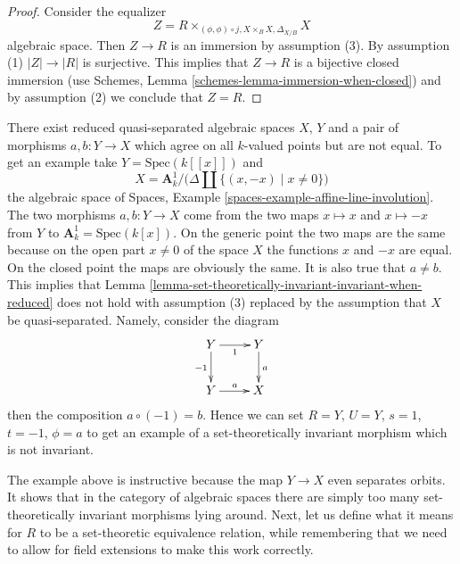 \begin{proof}
Consider the equalizer
$$
Z = R \times_{(\phi, \phi) \circ j, X \times_B X, \Delta_{X/B}} X
$$
algebraic space. Then $Z \to R$ is an immersion by assumption (3).
By assumption (1) $|Z| \to |R|$ is surjective. This implies that
$Z \to R$ is a bijective closed immersion (use
Schemes, Lemma \ref{schemes-lemma-immersion-when-closed})
and by assumption (2) we conclude that $Z = R$.
\end{proof}

\begin{example}
\label{example-not-invariant}
There exist reduced quasi-separated algebraic spaces $X$, $Y$ and a pair of
morphisms $a, b : Y \to X$ which agree on all $k$-valued points but are not
equal. To get an example take $Y = \text{Spec}(k[[x]])$ and
$$
X = \mathbf{A}^1_k \Big/ \big(\Delta \amalg \{(x, -x) \mid x \not = 0\}\big)
$$
the algebraic space of
Spaces, Example \ref{spaces-example-affine-line-involution}.
The two morphisms $a, b : Y \to X$
come from the two maps $x \mapsto x$ and $x \mapsto -x$
from $Y$ to $\mathbf{A}^1_k = \text{Spec}(k[x])$. On the generic point
the two maps are the same because on the open part $x \not = 0$ of the
space $X$ the functions $x$ and $-x$ are equal. On the closed point
the maps are obviously the same. It is also true that $a \not = b$.
This implies that
Lemma \ref{lemma-set-theoretically-invariant-invariant-when-reduced}
does not hold with assumption (3) replaced by the assumption that $X$
be quasi-separated. Namely, consider the diagram
$$
\xymatrix{
Y \ar[d]_{-1} \ar[r]_1 & Y \ar[d]^a \\
Y \ar[r]^a & X
}
$$
then the composition $a \circ (-1) = b$. Hence we can set $R = Y$,
$U = Y$, $s = 1$, $t = -1$, $\phi = a$ to get an example of a set-theoretically
invariant morphism which is not invariant.
\end{example}

\noindent
The example above is instructive because the map $Y \to X$ even separates
orbits. It shows that in the category of algebraic spaces there are simply
too many set-theoretically invariant morphisms lying around. Next, let us
define what it means for $R$ to be a set-theoretic equivalence relation, while
remembering that we need to allow for field extensions to make this work
correctly.

